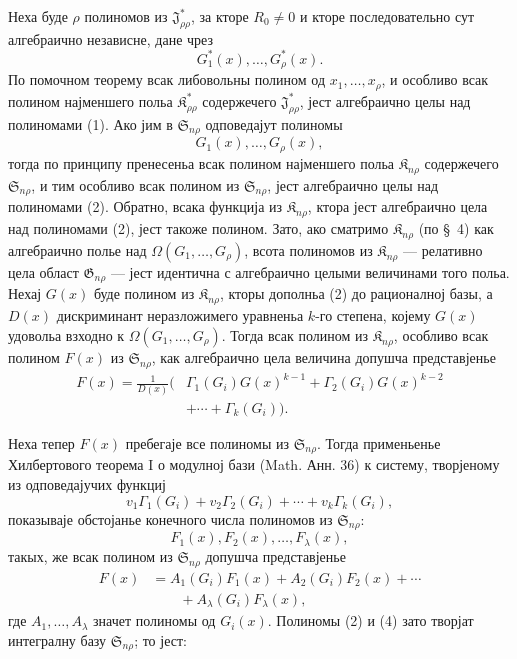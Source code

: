 ﻿\documentclass[11pt]{article}
\providecommand{\Kfield}{\mathfrak{K}}
\providecommand{\Ssys}{\mathfrak{S}}
\providecommand{\Jdom}{\mathfrak{J}}
\providecommand{\Gdom}{\mathfrak{G}}
\begin{document}
Неха буде $\rho$ полиномов из $\Jdom^*_{\rho\rho}$, за кторе $R_0\ne0$ и кторе последовательно сут алгебраично независне, дане чрез
\begin{equation}
  G_1^*(x),\ldots,G_\rho^*(x).
\tag{1}
\end{equation}
По помочном теорему всак либовольны полином од $x_1,\ldots,x_\rho$, и особливо всак полином најменшего польа $\Kfield^*_{\rho\rho}$ содержечего $\Jdom^*_{\rho\rho}$, јест алгебраично целы над полиномами (1). Ако јим в $\Ssys_{n\rho}$ одповедајут полиномы
\begin{equation}
  G_1(x),\ldots,G_\rho(x),
\tag{2}
\end{equation}
тогда по принципу пренесеньа всак полином најменшего польа $\Kfield_{n\rho}$ содержечего $\Ssys_{n\rho}$, и тим особливо всак полином из $\Ssys_{n\rho}$, јест алгебраично целы над полиномами (2). Обратно, всака функција из $\Kfield_{n\rho}$, ктора јест алгебраично цела над полиномами (2), јест такоже полином. Зато, ако сматримо $\Kfield_{n\rho}$ (по \S\ 4) как алгебраично полье над $\Omega(G_1,\ldots,G_\rho)$, всота полиномов из $\Kfield_{n\rho}$ --- релативно цела област $\Gdom_{n\rho}$ --- јест идентична с алгебраично целыми величинами того польа. Нехај $G(x)$ буде полином из $\Kfield_{n\rho}$, кторы дополньа (2) до рационалној базы, а $D(x)$ дискриминант неразложимего уравненьа $k$-го степена, којему $G(x)$ удовольа взходно к $\Omega(G_1,\ldots,G_\rho)$. Тогда всак полином из $\Kfield_{n\rho}$, особливо всак полином $F(x)$ из $\Ssys_{n\rho}$, как алгебраично цела величина допушча представјенье
\begin{equation}
\begin{split}
  F(x)=\frac{1}{D(x)}\big(&\Gamma_1(G_i)G(x)^{k-1}
    +\Gamma_2(G_i)G(x)^{k-2}\\
    &+\cdots+\Gamma_k(G_i)\big).
\end{split}
\tag{3}
\end{equation}

Неха тепер $F(x)$ пребегаје все полиномы из $\Ssys_{n\rho}$. Тогда применьенье Хилбертового теорема I о модулној бази (Math. Анн. 36) к систему, творјеному из одповедајучих функциј
\[
  v_1\Gamma_1(G_i)+v_2\Gamma_2(G_i)+\cdots+v_k\Gamma_k(G_i),
\]
показываје обстојанье конечного числа полиномов из $\Ssys_{n\rho}$:
\begin{equation}
  F_1(x),F_2(x),\ldots,F_\lambda(x),
\tag{4}
\end{equation}
такых, же всак полином из $\Ssys_{n\rho}$ допушча представјенье
\begin{equation}
\begin{aligned}
  F(x)&=A_1(G_i)F_1(x)+A_2(G_i)F_2(x)+\cdots\\
      &\qquad +A_\lambda(G_i)F_\lambda(x),
\end{aligned}
\tag{5}
\end{equation}
где $A_1,\ldots,A_\lambda$ значет полиномы од $G_i(x)$. Полиномы (2) и (4) зато творјат интегралну базу $\Ssys_{n\rho}$; то јест:
\end{document}
